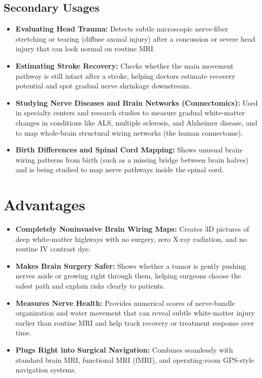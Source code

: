 \subsection{Secondary Usages}

\begin{itemize}
    \item \textbf{Evaluating Head Trauma:} Detects subtle microscopic nerve-fiber stretching or tearing (diffuse axonal injury) after a concussion or severe head injury that can look normal on routine MRI.
    \item \textbf{Estimating Stroke Recovery:} Checks whether the main movement pathway is still intact after a stroke, helping doctors estimate recovery potential and spot gradual nerve shrinkage downstream.
    \item \textbf{Studying Nerve Diseases and Brain Networks (Connectomics):} Used in specialty centers and research studies to measure gradual white-matter changes in conditions like ALS, multiple sclerosis, and Alzheimer disease, and to map whole-brain structural wiring networks (the human connectome).
    \item \textbf{Birth Differences and Spinal Cord Mapping:} Shows unusual brain-wiring patterns from birth (such as a missing bridge between brain halves) and is being studied to map nerve pathways inside the spinal cord.
\end{itemize}

\section{Advantages}

\begin{itemize}
    \item \textbf{Completely Noninvasive Brain Wiring Maps:} Creates 3D pictures of deep white-matter highways with no surgery, zero X-ray radiation, and no routine IV contrast dye.
    \item \textbf{Makes Brain Surgery Safer:} Shows whether a tumor is gently pushing nerves aside or growing right through them, helping surgeons choose the safest path and explain risks clearly to patients.
    \item \textbf{Measures Nerve Health:} Provides numerical scores of nerve-bundle organization and water movement that can reveal subtle white-matter injury earlier than routine MRI and help track recovery or treatment response over time.
    \item \textbf{Plugs Right into Surgical Navigation:} Combines seamlessly with standard brain MRI, functional MRI (fMRI), and operating-room GPS-style navigation systems.
\end{itemize}

